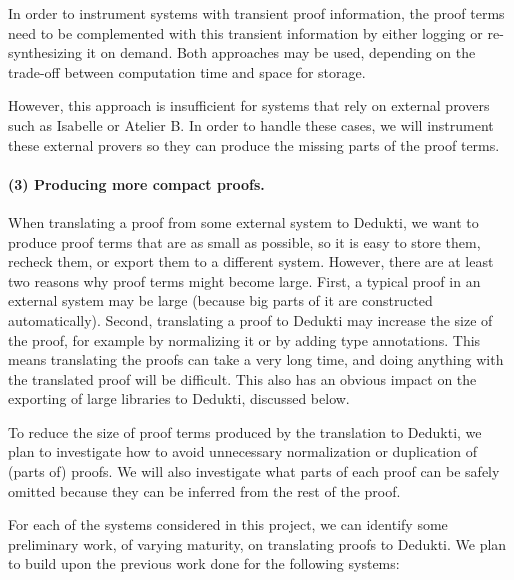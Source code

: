 In order to instrument systems with transient proof information, the
proof terms need to be complemented with this transient information by
either logging or re-synthesizing it on demand. Both approaches may be
used, depending on the trade-off between computation time and space
for storage.

However, this approach is insufficient for systems that rely on
external provers such as Isabelle or Atelier B. In order to handle these
cases, we will instrument these external provers so they can produce
the missing parts of the proof terms.

\paragraph*{(3) Producing more compact proofs.}
When translating a proof from some external system to Dedukti, we want
to produce proof terms that are as small as possible, so it is easy to
store them, recheck them, or export them to a different
system. However, there are at least two reasons why proof terms might
become large. First, a typical proof in an external system may be large
(because big parts of it are constructed automatically). Second,
translating a proof to Dedukti may increase the size of the proof, for
example by normalizing it or by adding type annotations.  This means
translating the proofs can take a very long time, and doing anything
with the translated proof will be difficult. This also has an obvious
impact on the exporting of large libraries to Dedukti, discussed
below.

To reduce the size of proof terms produced by the translation to
Dedukti, we plan to investigate how to avoid unnecessary
normalization or duplication of (parts of) proofs. We will also
investigate what parts of each proof can be safely omitted because
they can be inferred from the rest of the proof.

\bigskip

For each of the systems considered in this project, we can identify
some preliminary work, of varying maturity, on translating proofs to
Dedukti.  We plan to build upon the previous work done for the
following systems:

